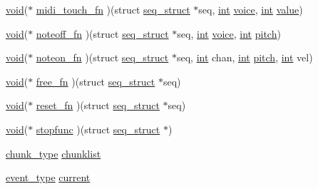 \begin{DoxyCompactItemize}
\item 
\hyperlink{sound_8c_ae35f5844602719cf66324f4de2a658b3}{void}($\ast$ \hyperlink{structseq__struct_ab6693e3eecd47c3e43879bc2d86e388e}{midi\+\_\+touch\+\_\+fn} )(struct \hyperlink{structseq__struct}{seq\+\_\+struct} $\ast$seq, \hyperlink{xmltok_8h_a5a0d4a5641ce434f1d23533f2b2e6653}{int} \hyperlink{seqread_8c_adc9c046fb3ac286b5dc54bb302aedecc}{voice}, \hyperlink{xmltok_8h_a5a0d4a5641ce434f1d23533f2b2e6653}{int} \hyperlink{lib_2expat_8h_a4a30a13b813682e68c5b689b45c65971}{value})
\item 
\hyperlink{sound_8c_ae35f5844602719cf66324f4de2a658b3}{void}($\ast$ \hyperlink{structseq__struct_a05d000bb501d7e26bbe4ac3182e0b172}{noteoff\+\_\+fn} )(struct \hyperlink{structseq__struct}{seq\+\_\+struct} $\ast$seq, \hyperlink{xmltok_8h_a5a0d4a5641ce434f1d23533f2b2e6653}{int} \hyperlink{seqread_8c_adc9c046fb3ac286b5dc54bb302aedecc}{voice}, \hyperlink{xmltok_8h_a5a0d4a5641ce434f1d23533f2b2e6653}{int} \hyperlink{seqread_8c_a7f083f7b76ea4d09b2820211a2b0d04e}{pitch})
\item 
\hyperlink{sound_8c_ae35f5844602719cf66324f4de2a658b3}{void}($\ast$ \hyperlink{structseq__struct_ac0db16fd627a17e659bbb86071eb0e75}{noteon\+\_\+fn} )(struct \hyperlink{structseq__struct}{seq\+\_\+struct} $\ast$seq, \hyperlink{xmltok_8h_a5a0d4a5641ce434f1d23533f2b2e6653}{int} chan, \hyperlink{xmltok_8h_a5a0d4a5641ce434f1d23533f2b2e6653}{int} \hyperlink{seqread_8c_a7f083f7b76ea4d09b2820211a2b0d04e}{pitch}, \hyperlink{xmltok_8h_a5a0d4a5641ce434f1d23533f2b2e6653}{int} vel)
\item 
\hyperlink{sound_8c_ae35f5844602719cf66324f4de2a658b3}{void}($\ast$ \hyperlink{structseq__struct_a5bcda4c9c9d57e541017b2d71b8e3f76}{free\+\_\+fn} )(struct \hyperlink{structseq__struct}{seq\+\_\+struct} $\ast$seq)
\item 
\hyperlink{sound_8c_ae35f5844602719cf66324f4de2a658b3}{void}($\ast$ \hyperlink{structseq__struct_aebcd2f73801979e6e53e68b81fe30c49}{reset\+\_\+fn} )(struct \hyperlink{structseq__struct}{seq\+\_\+struct} $\ast$seq)
\item 
\hyperlink{sound_8c_ae35f5844602719cf66324f4de2a658b3}{void}($\ast$ \hyperlink{structseq__struct_ac87c74e4692896b3ca9ee93cf0fcd153}{stopfunc} )(struct \hyperlink{structseq__struct}{seq\+\_\+struct} $\ast$)
\item 
\hyperlink{seq_8h_ae606409de8d1b871d9eba23746541f78}{chunk\+\_\+type} \hyperlink{structseq__struct_aeda222b5a2b5b9564099b14e8b69174b}{chunklist}
\item 
\hyperlink{seq_8h_af6509ba8f4584d40a046340b73d2bd15}{event\+\_\+type} \hyperlink{structseq__struct_a495dae0328f5aeb24840005ecafd6906}{current}

\end{DoxyCompactItemize}
